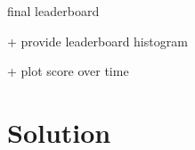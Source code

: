 \documentclass{beamer}
\begin{document}
\begin{frame}
\begin{center}
\end{center}
\end{frame}



\begin{frame}\frametitle{} 
\par final leaderboard
\par + provide leaderboard histogram
\par + plot score over time
\end{frame}




\section{Solution}
\end{document}
